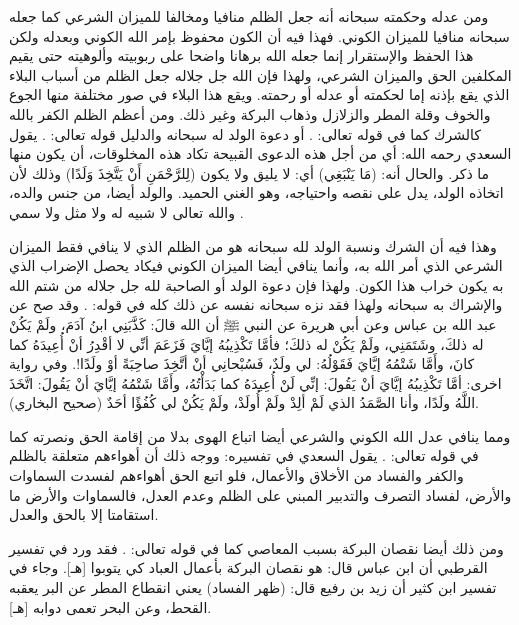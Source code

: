 ومن عدله وحكمته سبحانه أنه جعل الظلم منافيا ومخالفا للميزان الشرعي كما جعله سبحانه منافيا للميزان الكوني. فهذا فيه أن الكون محفوظ بإمر الله الكوني وبعدله ولكن هذا الحفظ والإستقرار إنما جعله الله برهانا واضحا على ربوبيته وألوهيته حتى يقيم المكلفين الحق والميزان الشرعي، ولهذا فإن الله جل جلاله جعل الظلم من أسباب البلاء الذي يقع بإذنه إما لحكمته أو عدله أو رحمته. ويقع هذا البلاء في صور مختلفة منها الجوع والخوف وقلة المطر والزلازل وذهاب البركة وغير ذلك. ومن أعظم الظلم الكفر بالله كالشرك كما في قوله تعالى: 
\quranayah*[31][13]{\footnotesize \surahname*[31]}. أو دعوة الولد له سبحانه والدليل قوله تعالى:
\quranayah*[19][88-91]{\footnotesize \surahname*[19]}. يقول السعدي رحمه الله: أي من أجل هذه الدعوى القبيحة تكاد هذه المخلوقات، أن يكون منها ما ذكر. والحال أنه: (مَا يَنْبَغِي) أي: لا يليق ولا يكون (لِلرَّحْمَنِ أَنْ يَتَّخِذَ وَلَدًا) وذلك لأن اتخاذه الولد، يدل على نقصه واحتياجه، وهو الغني الحميد. والولد أيضا، من جنس والده، والله تعالى لا شبيه له ولا مثل ولا سمي \cite{tafsir_Saadi}. 

وهذا فيه أن الشرك ونسبة الولد لله سبحانه هو من الظلم الذي لا ينافي فقط الميزان الشرعي الذي أمر الله به، وأنما ينافي أيضا الميزان الكوني فيكاد يحصل الإضراب الذي به يكون خراب هذا الكون. ولهذا فإن دعوة الولد أو الصاحبة لله جل جلاله من شتم الله والإشراك به سبحانه ولهذا فقد نزه سبحانه نفسه عن ذلك كله في قوله:
\quranayah*[6][100-103]{\footnotesize \surahname*[19]}. وقد صح عن عبد الله بن عباس وعن أبي هريرة عن النبي ﷺ أن الله قالَ: كَذَّبَنِي ابنُ آدَمَ، ولَمْ يَكُنْ له ذلكَ، وشَتَمَنِي، ولَمْ يَكُنْ له ذلكَ؛ فأمَّا تَكْذِيبُهُ إيَّايَ فَزَعَمَ أنِّي لا أقْدِرُ أنْ أُعِيدَهُ كما كانَ، وأَمَّا شَتْمُهُ إيَّايَ فَقَوْلُهُ: لي ولَدٌ، فَسُبْحانِي أنْ أتَّخِذَ صاحِبَةً أوْ ولَدًا!. وفي رواية اخرى: أمَّا تَكْذِيبُهُ إيَّايَ أنْ يَقُولَ: إنِّي لَنْ أُعِيدَهُ كما بَدَأْتُهُ، وأَمَّا شَتْمُهُ إيَّايَ أنْ يَقُولَ: اتَّخَذَ اللَّهُ ولَدًا، وأنا الصَّمَدُ الذي لَمْ ألِدْ ولَمْ أُولَدْ، ولَمْ يَكُنْ لي كُفُؤًا أحَدٌ {\footnotesize (صحيح البخاري)}.

ومما ينافي عدل الله الكوني والشرعي أيضا اتباع الهوى بدلا من إقامة الحق ونصرته كما في قوله تعالى:
\quranayah*[23][71]{\footnotesize \surahname*[23]}. يقول السعدي في تفسيره:
ووجه ذلك أن أهواءهم متعلقة بالظلم والكفر والفساد من الأخلاق والأعمال، فلو اتبع الحق أهواءهم لفسدت السماوات والأرض، لفساد التصرف والتدبير المبني على الظلم وعدم العدل، فالسماوات والأرض ما استقامتا إلا بالحق والعدل\cite{tafsir_Saadi}.

ومن ذلك أيضا نقصان البركة بسبب المعاصي كما في قوله تعالى:
\quranayah*[30][41]{\footnotesize \surahname*[30]}. فقد ورد في تفسير القرطبي أن ابن عباس قال: هو نقصان البركة بأعمال العباد كي يتوبوا [هـ]. وجاء في تفسير ابن كثير أن زيد بن رفيع قال: (ظهر الفساد) يعني انقطاع المطر عن البر يعقبه القحط، وعن البحر تعمى دوابه [هـ]. 

